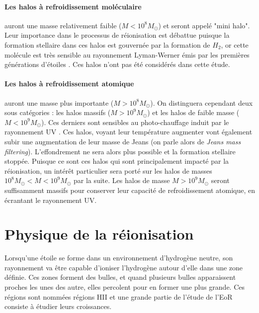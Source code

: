 \paragraph{Les halos à refroidissement moléculaire} auront une masse relativement faible ($M < 10^8 M_\odot$) et seront appelé "mini halo".
Leur importance dans le processus de réionisation est débattue \citep{2012ApJ...756L..16A} puisque la formation stellaire dans ces halos est gouvernée par la formation de $H_2$, or cette molécule est très sensible au rayonnement Lyman-Werner émis par les premières générations d'étoiles \citep{2002ApJ...575...49R}.
Ces halos n'ont pas été considérés dans cette étude.

\paragraph{Les halos à refroidissement atomique} auront une masse plus importante ($M > 10^8 M_\odot$).
On distinguera cependant deux sous catégories : les halos massifs ($M > 10^9 M_\odot$) et les halos de faible masse ($M< 10^9 M_\odot$).
Ces derniers sont sensibles au photo-chauffage induit par le rayonnement UV \citep{1998ApJ...497...21M}.
Ces halos, voyant leur température augmenter vont également subir une augmentation de leur masse de Jeans (on parle alors de \textit{Jeans mass filtering}).
L'effondrement ne sera alors plus possible et la formation stellaire stoppée.
Puisque ce sont ces halos qui sont principalement impacté par la réionisation, un intérêt particulier sera porté sur les halos de masses $10^8 M_\odot < M< 10^9 M_\odot$ par la suite.
Les halos de masse $M > 10^9 M_\odot$ seront suffisamment massifs pour conserver leur capacité de refroidissement atomique, en écrantant le rayonnement UV.

\section{Physique de la réionisation}

Lorsqu'une étoile se forme dans un environnement d'hydrogène neutre, son rayonnement va être capable d'ioniser l'hydrogène autour d'elle dans une zone définie.
Ces zones forment des bulles, et quand plusieurs bulles apparaissent proches les unes des autre, elles percolent pour en former une plus grande.
Ces régions sont nommées régions HII et une grande partie de l'étude de l'\ac{EoR} consiste à étudier leurs croissances.

